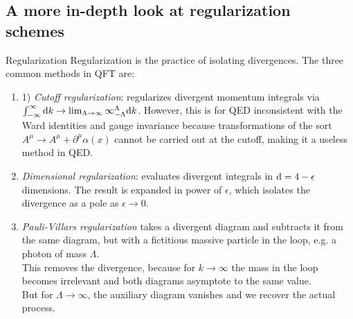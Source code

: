 \subsection{A more in-depth look at regularization schemes}
\label{subsec:renormalizationRegSchemes}
\begin{mybox}{Regularization}
	Regularization is the practice of isolating divergences. The three common methods in QFT are:
	\begin{enumerate}
		\item 1) \emph{Cutoff regularization}: regularizes divergent momentum integrals via $\int_{-\infty}^{\infty} \mathrm{d} k \rightarrow \lim_{\Lambda \rightarrow\infty} \infty_{-\Lambda}^{\Lambda} \mathrm{d} k$. However, this is for QED inconsistent with the Ward identities and gauge invariance because transformations of the sort $A^{\mu} \rightarrow A^{\mu} + \partial^{\mu} \alpha(x)$ cannot be carried out at the cutoff, making it a useless method in QED.
	\item \emph{Dimensional regularization}: evaluates divergent integrals in $\mathrm{d} =4-\epsilon$ dimensions. The result is expanded in power of $\epsilon$, which isolates the divergence as a pole as $\epsilon \rightarrow 0$.
	\item \emph{Pauli-Villars regularization} takes a divergent diagram and subtracts it from the same diagram, but with a fictitious massive particle in the loop, e.g. a photon of mass $\Lambda$.\\
	This removes the divergence, because for $k\rightarrow\infty$ the mass in the loop becomes irrelevant and both diagrams asymptote to the same value.\\
	But for $\Lambda \rightarrow \infty$, the auxiliary diagram vanishes and we recover the actual process.
	\end{enumerate}
\end{mybox}

